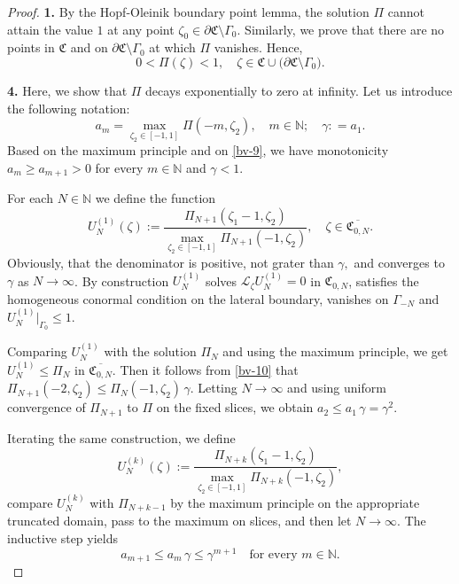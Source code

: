 \documentclass[reqno]{amsart}            %
\numberwithin{equation}{section}
\begin{document}
\begin{proof}{\bf 1.}
		By the Hopf-Oleinik boundary point lemma, the solution $\Pi$ cannot attain the value $1$ at any point $\zeta_0 \in \partial\mathfrak{C} \setminus \Gamma_0.$ 
		Similarly, we prove that there are no points in $\mathfrak{C}$ and on $\partial\mathfrak{C} \setminus \Gamma_0$ at which $\Pi$ vanishes.
		Hence,
		\begin{equation}\label{bv-9}
			0 < \Pi(\zeta) < 1, \quad \zeta \in \mathfrak{C} \cup \big(\partial\mathfrak{C} \setminus \Gamma_0\big).
		\end{equation}
		
		\smallskip 
		
		{\bf 4.}  Here, we show that $\Pi$  decays exponentially to zero at infinity. Let us introduce the following notation: 
		\[
		a_m=\max_{\zeta_2\in[-1,1]}\Pi(-m,\zeta_2), \quad m \in \mathbb{N}; \quad \gamma: =a_1.
		\]
		Based on the maximum principle and on \eqref{bv-9}, we have monotonicity $a_m \ge a_{m+1} > 0$ for every $m \in \mathbb{N}$ and $\gamma < 1.$ 
		
		For each $N \in \mathbb{N}$ we define the function
		\begin{equation}\label{bv-10}
			U_N^{(1)}(\zeta) := \frac{\Pi_{N+1}(\zeta_1 -1, \zeta_2)}{\max_{\zeta_2\in [-1,1]}\Pi_{N+1}(-1,\zeta_2)}, \quad \zeta \in \overline{\mathfrak{C}_{0,N}}.
		\end{equation}
		Obviously, that the denominator is positive, not grater than $\gamma,$  and converges to $\gamma$ as
		$N\to\infty$. 
		By construction $U_N^{(1)}$ solves $\mathcal L_\zeta U_N^{(1)}=0$ in $\mathfrak C_{0,N}$, satisfies the homogeneous conormal condition on the lateral boundary, vanishes on $\Gamma_{-N}$ and $U_N^{(1)}|_{\Gamma_0}\le 1.$
		
		Comparing  $U_N^{(1)}$ with the solution $\Pi_N$ and using the maximum principle, we get $U_N^{(1)} \le \Pi_N$ in $\overline{\mathfrak{C}_{0,N}}.$ Then it follows from \eqref{bv-10} that $\Pi_{N+1}(-2, \zeta_2) \le \Pi_N(-1, \zeta_2) \, \gamma .$ Letting $N\to\infty$ and using uniform convergence of $\Pi_{N+1}$ to $\Pi$ on the fixed slices,
		we obtain 
		$
		a_2 \le a_1 \, \gamma = \gamma^2.
		$ 
		
		Iterating the same construction, we define
		\[
		U_N^{(k)}(\zeta):=\frac{\Pi_{N+k}(\zeta_1-1,\zeta_2)}
		{\max_{\zeta_2\in [-1,1]}\Pi_{N+k}(-1,\zeta_2)},
		\]
		compare $U_N^{(k)}$ with $\Pi_{N+k-1}$ by the maximum principle on the appropriate truncated domain, pass to the maximum on slices, and then let $N\to\infty$. The inductive step yields
		\[
		a_{m+1} \le a_{m} \, \gamma \le\gamma^{m+1}
		\quad\text{for every }m\in\mathbb N.
		\]
		

\end{proof}
\end{document}
